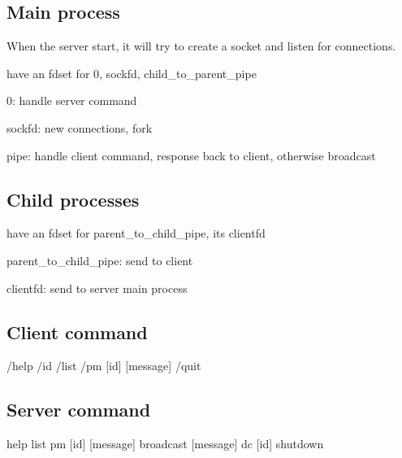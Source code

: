 \documentclass[12pt]{article}
\begin{document}
\subsection{Main process}

When the server start, it will try to create a socket and listen for connections.

have an fdset for 0, sockfd, child_to_parent_pipe

0: handle server command

sockfd: new connections, fork

pipe: handle client command, response back to client, otherwise broadcast

\subsection{Child processes}

have an fdset for parent_to_child_pipe, its clientfd

parent_to_child_pipe: send to client

clientfd: send to server main process

\subsection{Client command}

/help
/id
/list
/pm [id] [message]
/quit

\subsection{Server command}

help
list
pm [id] [message]
broadcast [message]
dc [id]
shutdown
\end{document}
